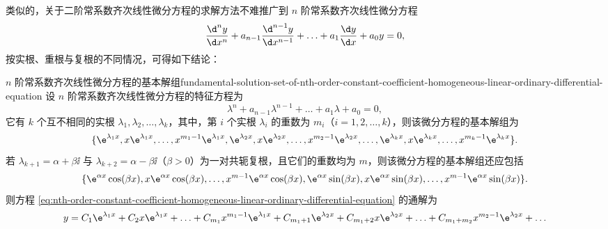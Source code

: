 \bigskip

类似的，关于二阶常系数齐次线性微分方程的求解方法不难推广到 $ n $ 阶常系数齐次线性微分方程
\begin{equation}
    \frac{\d^n y}{\d x^n} + a_{n-1} \frac{\d^{n-1} y}{\d x^{n-1}} + \ldots + a_1 \frac{\d y}{\d x} + a_0 y = 0 \label{eq:nth-order-constant-coefficient-homogeneous-linear-ordinary-differential-equation},
\end{equation}
按实根、重根与复根的不同情况，可得如下结论：
\begin{theorem}{$ n $ 阶常系数齐次线性微分方程的基本解组}{fundamental-solution-set-of-nth-order-constant-coefficient-homogeneous-linear-ordinary-differential-equation}
    设 $ n $ 阶常系数齐次线性微分方程的特征方程为
    \begin{equation*}
        \lambda^n + a_{n-1} \lambda^{n-1} + \ldots + a_1 \lambda + a_0 = 0 ,
    \end{equation*}
    它有 $ k $ 个互不相同的实根 $ \lambda_1 , \lambda_2 , \ldots , \lambda_k $，其中，第 $ i $ 个实根 $ \lambda_i $ 的重数为 $ m_i $（$ i = 1, 2, \ldots , k $），则该微分方程的基本解组为
    \begin{equation*}
        \{ \e^{\lambda_1 x} , x \e^{\lambda_1 x} , \ldots , x^{m_1 - 1} \e^{\lambda_1 x} , \e^{\lambda_2 x} , x \e^{\lambda_2 x} , \ldots , x^{m_2 - 1} \e^{\lambda_2 x} , \ldots , \e^{\lambda_k x} , x \e^{\lambda_k x} , \ldots , x^{m_k - 1} \e^{\lambda_k x} \} .
    \end{equation*}
    若 $ \lambda_{k+1} = \alpha + \beta \ii $ 与 $ \lambda_{k+2} = \alpha - \beta \ii $（$ \beta > 0 $）为一对共轭复根，且它们的重数均为 $ m $，则该微分方程的基本解组还应包括
    \begin{equation*}
        \{ \e^{\alpha x} \cos (\beta x) , x \e^{\alpha x} \cos (\beta x) , \ldots , x^{m - 1} \e^{\alpha x} \cos (\beta x) , \e^{\alpha x} \sin (\beta x) , x \e^{\alpha x} \sin (\beta x) , \ldots , x^{m - 1} \e^{\alpha x} \sin (\beta x) \} .
    \end{equation*}
    则方程 \cref{eq:nth-order-constant-coefficient-homogeneous-linear-ordinary-differential-equation} 的通解为
    \begin{equation*}
        y = C_1 \e^{\lambda_1 x} + C_2 x \e^{\lambda_1 x} + \ldots + C_{m_1} x^{m_1 - 1} \e^{\lambda_1 x} + C_{m_1 + 1} \e^{\lambda_2 x} + C_{m_1 + 2} x \e^{\lambda_2 x} + \ldots + C_{m_1 + m_2} x^{m_2 - 1} \e^{\lambda_2 x} + \ldots
    \end{equation*}
\end{theorem}

